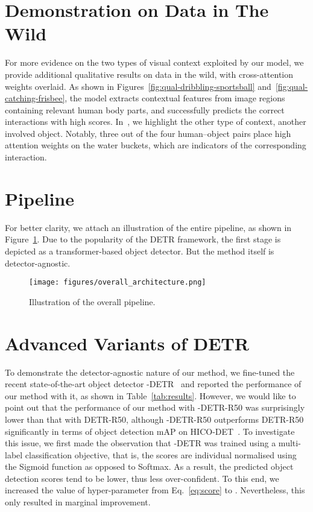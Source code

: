 \documentclass[10pt,twocolumn,letterpaper]{article}
\begin{document}
\section{Demonstration on Data in The Wild}

For more evidence on the two types of visual context exploited by our model, we provide additional qualitative results on data in the wild, with cross-attention weights overlaid. As shown in Figures~\ref{fig:qual-dribbling-sportsball} and~\ref{fig:qual-catching-frisbee}, the model extracts contextual features from image regions containing relevant human body parts, and successfully predicts the correct interactions with high scores. In~, we highlight the other type of context, \ie another involved object. Notably, three out of the four human--object pairs place high attention weights on the water buckets, which are indicators of the corresponding interaction.

\section{Pipeline}

For better clarity, we attach an illustration of the entire pipeline, as shown in Figure~\ref{fig:pipeline}. Due to the popularity of the DETR framework, the first stage is depicted as a transformer-based object detector. But the method itself is detector-agnostic.

\begin{figure}
    \centering
    \texttt{[image: figures/overall\_architecture.png]}
    \caption{Illustration of the overall pipeline.}
    \label{fig:pipeline}
\end{figure}

\section{Advanced Variants of DETR}

To demonstrate the detector-agnostic nature of our method,
we fine-tuned the recent state-of-the-art object detector -DETR~\cite{hdetr}
and reported the performance of our method with it, as shown in Table~\ref{tab:results}.
However, we would like to point out that the performance of our method with -DETR-R50
was surprisingly lower than that with DETR-R50,
although -DETR-R50 outperforms DETR-R50 significantly in terms of object detection mAP on HICO-DET~\cite{hicodet}.
To investigate this issue,
we first made the observation that -DETR was trained using a multi-label classification objective,
that is, the scores are individual normalised using the Sigmoid function as opposed to Softmax.
As a result, the predicted object detection scores tend to be lower, thus less over-confident.
To this end, we increased the value of hyper-parameter  from Eq.~\ref{eq:score} to .
Nevertheless, this only resulted in marginal improvement.
\end{document}
